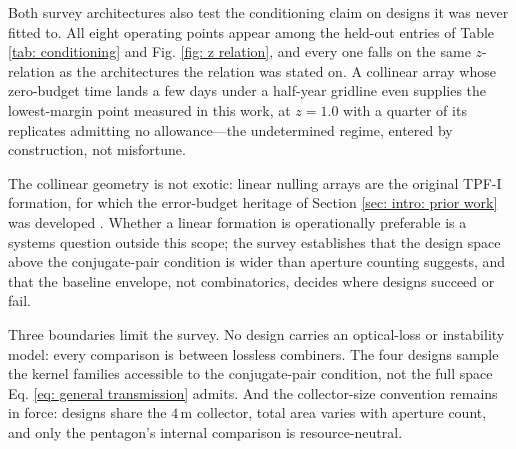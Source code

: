 \documentclass[12pt,a4paper]{article}
\numberwithin{equation}{section}
\numberwithin{figure}{section}
\numberwithin{table}{section}
\begin{document}
Both survey architectures also test the conditioning claim on designs it was never fitted to. All eight operating points appear among the held-out entries of Table \ref{tab: conditioning} and Fig. \ref{fig: z relation}, and every one falls on the same $z$-relation as the architectures the relation was stated on. A collinear array whose zero-budget time lands a few days under a half-year gridline even supplies the lowest-margin point measured in this work, at $z=1.0$ with a quarter of its replicates admitting no allowance---the undetermined regime, entered by construction, not misfortune.

The collinear geometry is not exotic: linear nulling arrays are the original TPF-I formation, for which the error-budget heritage of Section \ref{sec: intro: prior work} was developed \cite{lay2004systematic, lawson2005tpfitech}. Whether a linear formation is operationally preferable is a systems question outside this scope; the survey establishes that the design space above the conjugate-pair condition is wider than aperture counting suggests, and that the baseline envelope, not combinatorics, decides where designs succeed or fail.

Three boundaries limit the survey. No design carries an optical-loss or instability model: every comparison is between lossless combiners. The four designs sample the kernel families accessible to the conjugate-pair condition, not the full space Eq. \ref{eq: general transmission} admits. And the collector-size convention remains in force: designs share the $4$\,m collector, total area varies with aperture count, and only the pentagon's internal comparison is resource-neutral.
\end{document}
